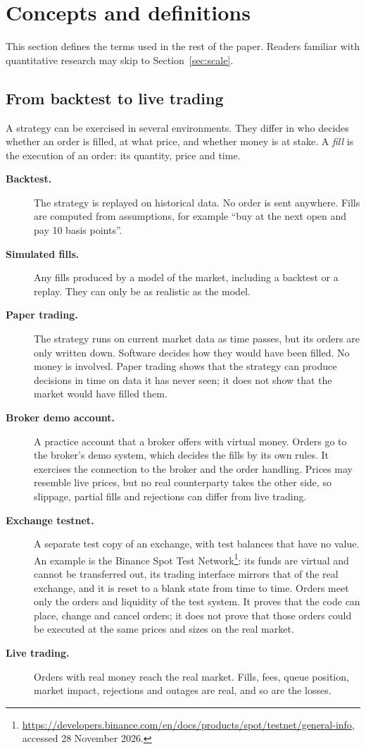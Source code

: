\documentclass[11pt]{article}
\newcommand{\term}[1]{\item[\textbf{#1}]}
\begin{document}
\section{Concepts and definitions}\label{sec:defs}

This section defines the terms used in the rest of the paper. Readers familiar with quantitative research may skip to
Section~\ref{sec:scale}.

\subsection{From backtest to live trading}\label{sec:modes}

A strategy can be exercised in several environments. They differ in who decides whether an order is filled, at what
price, and whether money is at stake. A \emph{fill} is the execution of an order: its quantity, price and time.

\begin{description}
\term{Backtest.} The strategy is replayed on historical data. No order is sent anywhere. Fills are computed from
assumptions, for example ``buy at the next open and pay 10 basis points''.
\term{Simulated fills.} Any fills produced by a model of the market, including a backtest or a replay. They can only be
as realistic as the model.
\term{Paper trading.} The strategy runs on current market data as time passes, but its orders are only written down.
Software decides how they would have been filled. No money is involved. Paper trading shows that the strategy can
produce decisions in time on data it has never seen; it does not show that the market would have filled them.
\term{Broker demo account.} A practice account that a broker offers with virtual money. Orders go to the broker's demo
system, which decides the fills by its own rules. It exercises the connection to the broker and the order handling.
Prices may resemble live prices, but no real counterparty takes the other side, so slippage, partial fills and
rejections can differ from live trading.
\term{Exchange testnet.} A separate test copy of an exchange, with test balances that have no value. An example is the
Binance Spot Test Network\footnote{\url{https://developers.binance.com/en/docs/products/spot/testnet/general-info},
accessed 28 November 2026.}: its funds are virtual and cannot be transferred out, its trading interface mirrors that of
the real exchange, and it is reset to a blank state from time to time. Orders meet only the orders and liquidity of the
test system. It proves that the code can place, change and cancel orders; it does not prove that those orders could be
executed at the same prices and sizes on the real market.
\term{Live trading.} Orders with real money reach the real market. Fills, fees, queue position, market impact,
rejections and outages are real, and so are the losses.
\end{description}
\end{document}
